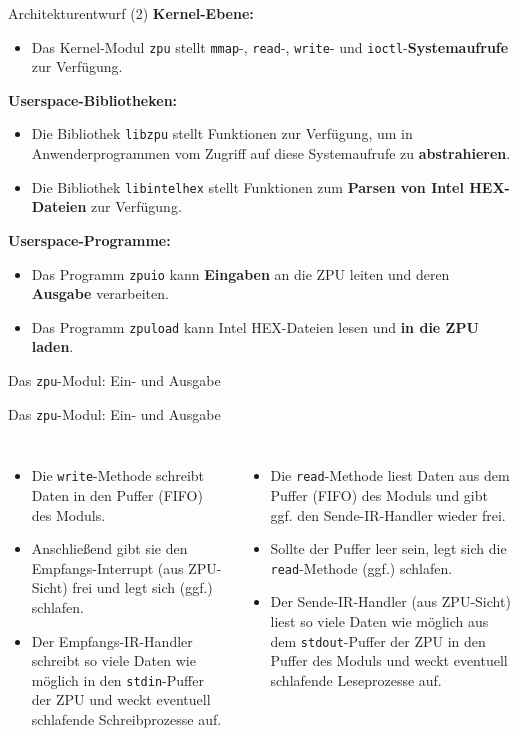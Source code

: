 \documentclass[10pt]{beamer}
\begin{document}
	\begin{frame}{Architekturentwurf (2)}
		\textbf{Kernel-Ebene:}
		\begin{itemize}
			\item Das Kernel-Modul \texttt{zpu} stellt \texttt{mmap}-, \texttt{read}-, \texttt{write}- und \texttt{ioctl}-\textbf{Systemaufrufe} zur Verfügung.
		\end{itemize}
		\textbf{Userspace-Bibliotheken:}
		\begin{itemize}
			\item Die Bibliothek \texttt{libzpu} stellt Funktionen zur Verfügung, um in Anwenderprogrammen vom Zugriff auf diese Systemaufrufe zu \textbf{abstrahieren}.
			\item Die Bibliothek \texttt{libintelhex} stellt Funktionen zum \textbf{Parsen von Intel HEX-Dateien} zur Verfügung.
		\end{itemize}
		\textbf{Userspace-Programme:}
		\begin{itemize}
			\item Das Programm \texttt{zpuio} kann \textbf{Eingaben} an die ZPU leiten und deren \textbf{Ausgabe} verarbeiten.
			\item Das Programm \texttt{zpuload} kann Intel HEX-Dateien lesen und \textbf{in die ZPU laden}.
		\end{itemize}
	\end{frame}
	
	\begin{frame}{Das \texttt{zpu}-Modul: Ein- und Ausgabe}
		\begin{center}
			
		\end{center}
	\end{frame}
	
	\begin{frame}{Das \texttt{zpu}-Modul: Ein- und Ausgabe}
	\begin{columns}
		\begin{itemize}
			\item Die \texttt{write}-Methode schreibt Daten in den Puffer (FIFO) des Moduls.
			\item Anschließend gibt sie den Empfangs-Interrupt (aus ZPU-Sicht) frei und legt sich (ggf.) schlafen.
			\item Der Empfangs-IR-Handler schreibt so viele Daten wie möglich in den \texttt{stdin}-Puffer der ZPU und weckt eventuell schlafende Schreibprozesse auf.
		\end{itemize}
		\begin{itemize}
			\item Die \texttt{read}-Methode liest Daten aus dem Puffer (FIFO) des Moduls und gibt ggf. den Sende-IR-Handler wieder frei.
			\item Sollte der Puffer leer sein, legt sich die \texttt{read}-Methode (ggf.) schlafen.
			\item Der Sende-IR-Handler (aus ZPU-Sicht) liest so viele Daten wie möglich aus dem \texttt{stdout}-Puffer der ZPU in den Puffer des Moduls und weckt eventuell schlafende Leseprozesse auf.
		\end{itemize}
	\end{columns}
	\end{frame}
	
\end{document}
